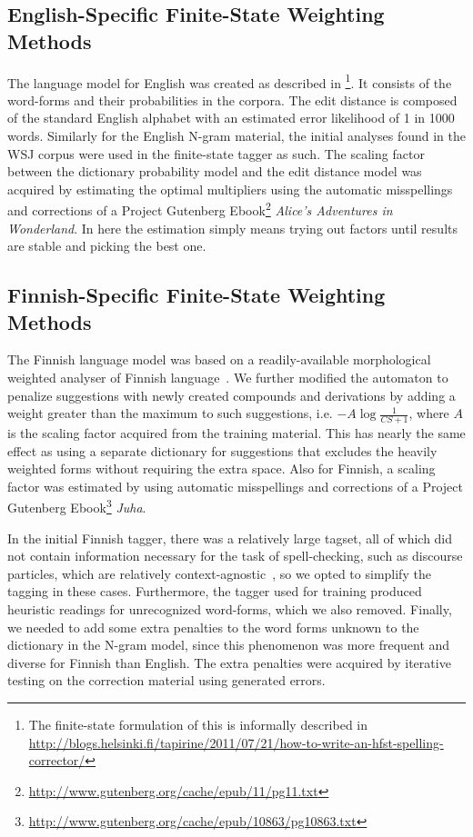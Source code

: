 \documentclass{llncs}
\begin{document}
\subsection{English-Specific Finite-State Weighting Methods}

The language model for English was created as described in
\cite{norvig/2010}\footnote{The finite-state formulation of this is informally
described in
\url{http://blogs.helsinki.fi/tapirine/2011/07/21/how-to-write-an-hfst-spelling-corrector/}}.
It consists of the word-forms and their  probabilities in the corpora. The edit
distance is composed of the standard English alphabet with an estimated error
likelihood of 1 in 1000 words.  Similarly for the English N-gram material, the
initial analyses found in the WSJ corpus were used in the finite-state tagger
as such. The scaling factor between the dictionary probability model and the
edit distance model was acquired by estimating the optimal multipliers using
the automatic misspellings and corrections of a Project Gutenberg
Ebook\footnote{\url{http://www.gutenberg.org/cache/epub/11/pg11.txt}}
\emph{Alice's Adventures in Wonderland}. In here the estimation simply means
trying out factors until results are stable and picking the best one.

\subsection{Finnish-Specific Finite-State Weighting Methods}

The Finnish language model was based on a readily-available morphological
weighted analyser of Finnish language~\cite{pirinen/2011/nodalida}.  We further
modified the automaton to penalize suggestions with newly created compounds and
derivations by adding a weight greater than the maximum to such suggestions,
i.e. $-A\log\frac{1}{CS+1}$, where $A$ is the scaling factor acquired from the
training material. This has nearly the same effect as using a separate
dictionary for suggestions that excludes the heavily weighted forms without
requiring the extra space.  Also for Finnish, a scaling factor was estimated by
using automatic misspellings and corrections of a Project Gutenberg
Ebook\footnote{\url{http://www.gutenberg.org/cache/epub/10863/pg10863.txt}}
\emph{Juha}.

In the initial Finnish tagger, there was a relatively large tagset, all of
which did not contain information necessary for the task of
spell-checking, such as discourse particles, which are relatively
context-agnostic~\cite{visk}, so we opted to simplify the tagging in these
cases. Furthermore, the tagger used for training produced heuristic readings for
unrecognized word-forms, which we also removed. Finally, we needed to add
some extra penalties to the word forms unknown to the dictionary in the 
N-gram model, since this phenomenon was more frequent and diverse for Finnish
than English. The extra penalties were acquired by iterative testing on the
correction material using generated errors.
\end{document}
